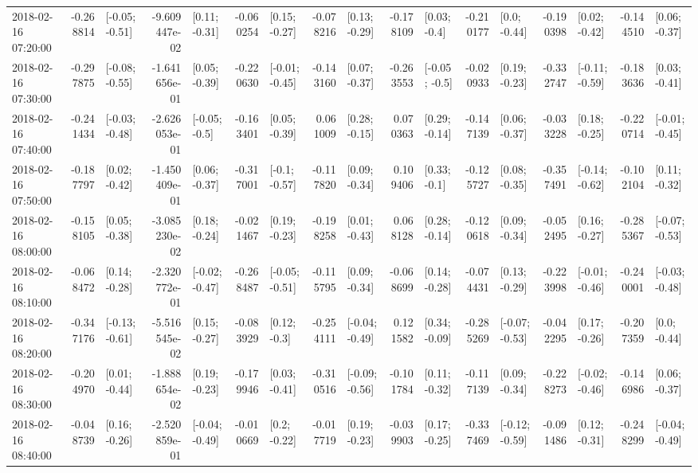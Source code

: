 \begin{tabular}{lrlrlrlrlrlrlrlrl}
2018-02-16 07:20:00 & -0.268814 &  [-0.05; -0.51] & -9.609447e-02 &   [0.11; -0.31] & -0.060254 &   [0.15; -0.27] & -0.078216 &   [0.13; -0.29] & -0.178109 &    [0.03; -0.4] & -0.210177 &    [0.0; -0.44] & -0.190398 &   [0.02; -0.42] & -0.144510 &   [0.06; -0.37] \\
2018-02-16 07:30:00 & -0.297875 &  [-0.08; -0.55] & -1.641656e-01 &   [0.05; -0.39] & -0.220630 &  [-0.01; -0.45] & -0.143160 &   [0.07; -0.37] & -0.263553 &   [-0.05; -0.5] & -0.020933 &   [0.19; -0.23] & -0.332747 &  [-0.11; -0.59] & -0.183636 &   [0.03; -0.41] \\
2018-02-16 07:40:00 & -0.241434 &  [-0.03; -0.48] & -2.626053e-01 &   [-0.05; -0.5] & -0.163401 &   [0.05; -0.39] &  0.061009 &   [0.28; -0.15] &  0.070363 &   [0.29; -0.14] & -0.147139 &   [0.06; -0.37] & -0.033228 &   [0.18; -0.25] & -0.220714 &  [-0.01; -0.45] \\
2018-02-16 07:50:00 & -0.187797 &   [0.02; -0.42] & -1.450409e-01 &   [0.06; -0.37] & -0.317001 &   [-0.1; -0.57] & -0.117820 &   [0.09; -0.34] &  0.109406 &    [0.33; -0.1] & -0.125727 &   [0.08; -0.35] & -0.357491 &  [-0.14; -0.62] & -0.102104 &   [0.11; -0.32] \\
2018-02-16 08:00:00 & -0.158105 &   [0.05; -0.38] & -3.085230e-02 &   [0.18; -0.24] & -0.021467 &   [0.19; -0.23] & -0.198258 &   [0.01; -0.43] &  0.068128 &   [0.28; -0.14] & -0.120618 &   [0.09; -0.34] & -0.052495 &   [0.16; -0.27] & -0.285367 &  [-0.07; -0.53] \\
2018-02-16 08:10:00 & -0.068472 &   [0.14; -0.28] & -2.320772e-01 &  [-0.02; -0.47] & -0.268487 &  [-0.05; -0.51] & -0.115795 &   [0.09; -0.34] & -0.068699 &   [0.14; -0.28] & -0.074431 &   [0.13; -0.29] & -0.223998 &  [-0.01; -0.46] & -0.240001 &  [-0.03; -0.48] \\
2018-02-16 08:20:00 & -0.347176 &  [-0.13; -0.61] & -5.516545e-02 &   [0.15; -0.27] & -0.083929 &    [0.12; -0.3] & -0.254111 &  [-0.04; -0.49] &  0.121582 &   [0.34; -0.09] & -0.285269 &  [-0.07; -0.53] & -0.042295 &   [0.17; -0.26] & -0.207359 &    [0.0; -0.44] \\
2018-02-16 08:30:00 & -0.204970 &   [0.01; -0.44] & -1.888654e-02 &   [0.19; -0.23] & -0.179946 &   [0.03; -0.41] & -0.310516 &  [-0.09; -0.56] & -0.101784 &   [0.11; -0.32] & -0.117139 &   [0.09; -0.34] & -0.228273 &  [-0.02; -0.46] & -0.146986 &   [0.06; -0.37] \\
2018-02-16 08:40:00 & -0.048739 &   [0.16; -0.26] & -2.520859e-01 &  [-0.04; -0.49] & -0.010669 &    [0.2; -0.22] & -0.017719 &   [0.19; -0.23] & -0.039903 &   [0.17; -0.25] & -0.337469 &  [-0.12; -0.59] & -0.091486 &   [0.12; -0.31] & -0.248299 &  [-0.04; -0.49] \\

\end{tabular}

